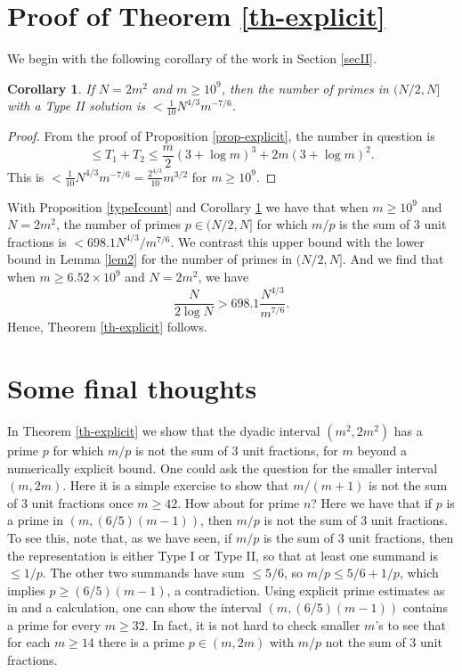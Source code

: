 \documentclass[12pt]{amsart}
\newtheorem{corollary}[theorem]{Corollary}
\theoremstyle{definition}
\theoremstyle{remark}
\numberwithin{equation}{section}
\begin{document}
\section{Proof of Theorem \ref{th-explicit}}

We begin with the following corollary of the work in Section \ref{secII}.
\begin{corollary}
\label{cor}
If $N=2m^2$ and $m\ge 10^9$, then the number of primes in $(N/2,N]$ with a Type II solution is $< \frac{1}{10} N^{4/3} m^{-7/6}$.
\end{corollary}

\begin{proof}
 From the proof of Proposition \ref{prop-explicit}, the number in question is 
$$
\le T_1+T_2 \le \frac{m}{2}(3+\log m)^3+2m(3+\log m)^2.
$$
This is $<\frac{1}{10} N^{4/3} m^{-7/6} = \frac{2^{4/3}}{10}  m^{3/2} $ for $m\ge 10^9$.
\end{proof}

With Proposition \ref{typeIcount} and Corollary \ref{cor} we have that 
when $m\ge10^9$ and $N=2m^2$, the number of primes $p\in(N/2,N]$ for which
$m/p$ is the sum of 3 unit fractions is $< 698.1N^{4/3}/m^{7/6}$.  We contrast this
upper bound with the lower bound in Lemma \ref{lem2} for the number of primes in $(N/2,N]$.
And we find that when $m\ge6.52\times10^9$ and $N=2m^2$, we have
\[
\frac N{2\log N}>698.1\frac{N^{4/3}}{m^{7/6}}.
\]
Hence, Theorem \ref{th-explicit} follows.

\section{Some final thoughts}

In Theorem \ref{th-explicit} we show that the dyadic interval $(m^2,2m^2)$ has a
prime $p$ for which $m/p$ is not the sum of 3 unit fractions, for $m$ beyond a
numerically explicit bound.  One could ask the question for the smaller interval $(m,2m)$.
Here it is a simple exercise to show that $m/(m+1)$ is not the sum of 3 unit fractions
once $m\ge42$.  How about for prime $n$?  Here we have that if $p$ is a prime
in $(m,(6/5)(m-1))$, then $m/p$ is not the sum of 3 unit fractions.  To see this,
note that, as we have seen, if $m/p$ is the sum of 3 unit fractions, then the representation
is either Type I or Type II, so that at least one summand is $\le 1/p$.  The other two
summands have sum $\le 5/6$, so $m/p \le 5/6+1/p$, which implies $p\ge(6/5)(m-1)$,
a contradiction.  Using explicit prime estimates as in \cite{Dus} and a calculation, one can show 
the interval $(m,(6/5)(m-1))$ contains a prime for every $m\ge32$.  In fact, it is not hard
to check smaller $m$'s to see that for each $m\ge14$ there is a prime $p\in(m,2m)$ with
$m/p$ not the sum of 3 unit fractions.
\end{document}
